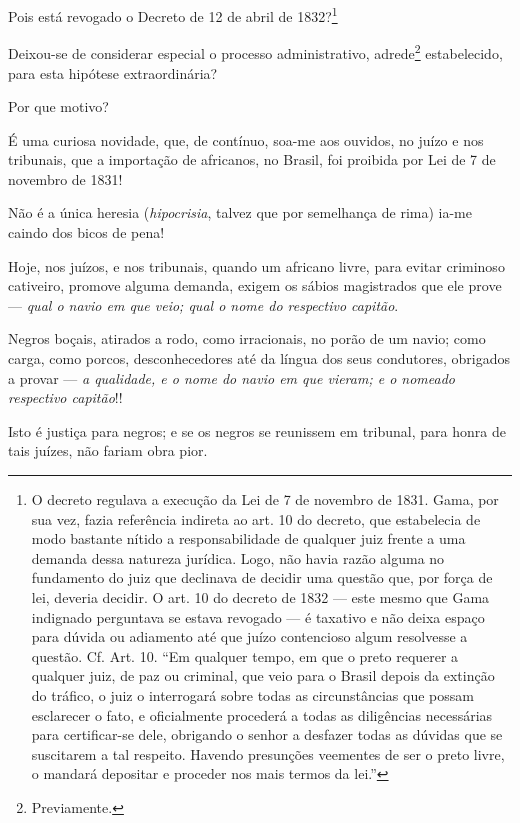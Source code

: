 {Pois está revogado o Decreto de 12 de abril de 1832?\footnote{O
  decreto regulava a execução da Lei de 7 de novembro de 1831. Gama, por
  sua vez, fazia referência indireta ao art. 10 do decreto, que
  estabelecia de modo bastante nítido a responsabilidade de qualquer
  juiz frente a uma demanda dessa natureza jurídica. Logo, não havia
  razão alguma no fundamento do juiz que declinava de decidir uma
  questão que, por força de lei, deveria decidir. O art. 10 do decreto
  de 1832 --- este mesmo que Gama indignado perguntava se estava revogado
  --- é taxativo e não deixa espaço para dúvida ou adiamento até que juízo
  contencioso algum resolvesse a questão. Cf. Art. 10. ``Em qualquer
  tempo, em que o preto requerer a qualquer juiz, de paz ou criminal,
  que veio para o Brasil depois da extinção do tráfico, o juiz o
  interrogará sobre todas as circunstâncias que possam esclarecer o
  fato, e oficialmente procederá a todas as diligências necessárias para
  certificar-se dele, obrigando o senhor a desfazer todas as dúvidas que
  se suscitarem a tal respeito. Havendo presunções veementes de ser o
  preto livre, o mandará depositar e proceder nos mais termos da lei.''}

Deixou-se de considerar especial o processo administrativo,
adrede\footnote{Previamente.} estabelecido, para esta hipótese
extraordinária?

Por que motivo?

\asterisc

É uma curiosa novidade, que, de contínuo, soa-me aos ouvidos, no juízo e
nos tribunais, que a importação de africanos, no Brasil, foi proibida
por Lei de 7 de novembro de 1831!

Não é a única heresia (\emph{hipocrisia}, talvez que por semelhança de
rima) ia-me caindo dos bicos de pena!

Hoje, nos juízos, e nos tribunais, quando um africano livre, para evitar
criminoso cativeiro, promove alguma demanda, exigem os sábios
magistrados que ele prove --- \emph{qual o navio em que veio; qual o nome
do respectivo capitão}.

Negros boçais, atirados a rodo, como irracionais, no porão de um navio;
como carga, como porcos, desconhecedores até da língua dos seus
condutores, obrigados a provar --- \emph{a qualidade, e o nome do navio em
que vieram; e o nomeado respectivo capitão}!!

Isto é justiça para negros; e se os negros se reunissem em tribunal,
para honra de tais juízes, não fariam obra pior.

}
